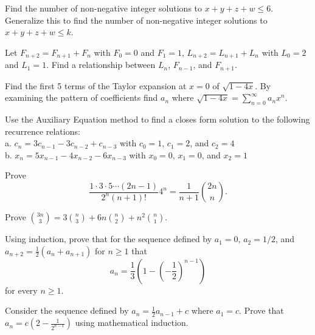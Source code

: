 \begin{exercise}
Find the number of non-negative integer solutions to $x+y+z+w\le6$. Generalize this to find the number of non-negative integer solutions to $x+y+z+w\le k$.
\end{exercise}

\begin{exercise}
Let $F_{n+2}=F_{n+1}+F_{n}$ with $F_0=0$ and $F_1=1$, $L_{n+2}=L_{n+1}+L_{n}$ with $L_0=2$ and $L_1=1$.  Find a relationship between $L_n$, $F_{n-1}$, and $F_{n+1}$.
\end{exercise}

\begin{exercise}
Find the first 5 terms of the Taylor expansion at $x=0$ of $\sqrt{1-4x}$.  By examining the pattern of coefficients find $a_n$ where $\sqrt{1-4x}=\sum_{n=0}^{\infty}a_nx^n$.
\end{exercise}

\begin{exercise}
Use the Auxiliary Equation method to find a closes form solution to the following recurrence relations:\\
a. $c_n=3c_{n-1}-3c_{n-2}+c_{n-3}$ with $c_0=1$, $c_1=2$, and $c_2=4$\\
b. $x_n=5x_{n-1}-4x_{n-2}-6x_{n-3}$ with $x_0=0$, $x_1=0$, and $x_2=1$\\
\end{exercise}


\begin{proofp}
Prove $$\frac{1\cdot 3 \cdot 5 \cdots (2n-1)}{2^n (n+1)!}4^n=\frac{1}{n+1} \binom{2n}{n}.$$
\end{proofp}


\begin{proofp}
Prove $\binom{3n}{3}=3\binom{n}{3}+6n\binom{n}{2}+n^2\binom{n}{1}$.
\end{proofp}

\begin{proofp}
Using induction, prove that for the sequence defined by $a_1=0$, $a_2=1/2$, and $a_{n+2}=\frac{1}{2}(a_n+a_{n+1})$ for $n \ge 1$ that  $$a_n=\frac{1}{3}\left(1-\left(-\frac{1}{2}\right)^{n-1}\right)$$ for every $n \ge 1$.
\end{proofp}


\begin{proofp}
Consider the sequence defined by $a_n=\frac{1}{2}a_{n-1}+c$ where $a_1=c$.  Prove that $a_n=c(2-\frac{1}{2^{n-1}})$ using mathematical induction.
\end{proofp}

